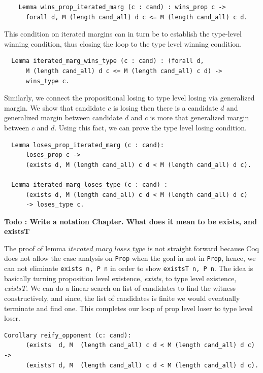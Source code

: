 \begin{verbatim}
    Lemma wins_prop_iterated_marg (c : cand) : wins_prop c ->
      forall d, M (length cand_all) d c <= M (length cand_all) c d.
\end{verbatim}

\noindent
This condition on iterated margins can in turn be to establish the
type-level winning condition, thus closing the loop to the type
level winning condition.

\begin{verbatim}
  Lemma iterated_marg_wins_type (c : cand) : (forall d,
      M (length cand_all) d c <= M (length cand_all) c d) ->
      wins_type c.
\end{verbatim}

Similarly, we connect the propositional losing to type level losing via generalized margin. We show that 
candidate $c$ is losing then there is a candidate $d$ and generalized margin between candidate $d$ and 
$c$ is more that generalized margin between $c$ and $d$.  Using this fact, we can prove the 
type level losing condition. 

\begin{verbatim} 
  Lemma loses_prop_iterated_marg (c : cand):
      loses_prop c ->
      (exists d, M (length cand_all) c d < M (length cand_all) d c).

  Lemma iterated_marg_loses_type (c : cand) :
      (exists d, M (length cand_all) c d < M (length cand_all) d c) 
      -> loses_type c.
\end{verbatim}

\textbf{Todo : Write a notation Chapter. What does it mean to be exists, and existsT}

The proof of lemma  $iterated\_marg\_loses\_type$ is not straight forward because
Coq does not allow the case analysis on \texttt{Prop} when the goal in not in \texttt{Prop}, 
hence,  we can not eliminate \texttt{exists n, P n} in order to show \texttt{existsT n, P n}. 
The idea is basically turning proposition level existence, \emph{exists}, 
to type level existence, \emph{existsT}. 
We can do  a linear search on list of candidates  to find the witness constructively, and since, 
the list of candidates is  finite we would eventually terminate and find one.  
This completes our loop of prop level loser to type level loser. 

\begin{verbatim}
Corollary reify_opponent (c: cand):
      (exists  d, M  (length cand_all) c d < M (length cand_all) d c) ->
      (existsT d, M  (length cand_all) c d < M (length cand_all) d c).
\end{verbatim}



